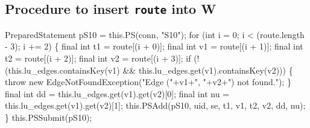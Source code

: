 \subsection{Procedure to insert \texttt{route} into W}
\nwenddocs{}\endmoddef{}
PreparedStatement pS10 = this.PS(conn, "S10");
for (int i = 0; i < (route.length - 3); i += 2) \{
  final int t1 = route[(i + 0)];
  final int v1 = route[(i + 1)];
  final int t2 = route[(i + 2)];
  final int v2 = route[(i + 3)];
  if (!(this.lu_edges.containsKey(v1) && this.lu_edges.get(v1).containsKey(v2))) \{
    throw new EdgeNotFoundException("Edge ("+v1+", "+v2+") not found.");
  \}
  final int dd = this.lu_edges.get(v1).get(v2)[0];
  final int nu = this.lu_edges.get(v1).get(v2)[1];
  this.PSAdd(pS10, uid, se, t1, v1, t2, v2, dd, nu);
\}
this.PSSubmit(pS10);
\nwendcode{}\nwdocspar

